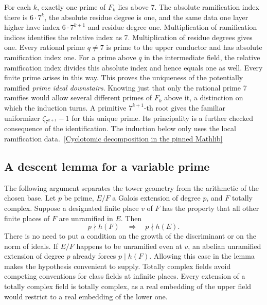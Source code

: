 \documentclass[12pt,letterpaper]{article}
\begin{document}
For each \(k\), exactly one prime of \(F_k\) lies above 7. The absolute ramification index there is \(6\cdot7^k\), the absolute residue degree is one, and the same data one layer higher have index \(6\cdot7^{k+1}\) and residue degree one. Multiplication of ramification indices identifies the relative index as 7. Multiplication of residue degrees gives one. Every rational prime \(q\ne7\) is prime to the upper conductor and has absolute ramification index one. For a prime above \(q\) in the intermediate field, the relative ramification index divides this absolute index and hence equals one as well. Every finite prime arises in this way. This proves the uniqueness of the potentially ramified \emph{prime ideal downstairs}. Knowing just that only the rational prime 7 ramifies would allow several different primes of \(F_k\) above it, a distinction on which the induction turns. A primitive \(7^{k+1}\)-th root gives the familiar uniformizer \(\zeta_{7^{k+1}}-1\) for this unique prime. Its principality is a further checked consequence of the identification. The induction below only uses the local ramification data.\
\href{https://github.com/leanprover-community/mathlib4/blob/0df444a360eaa60ab8c11dca51a86af692955474/Mathlib/NumberTheory/NumberField/Cyclotomic/Ideal.lean}{[Cyclotomic decomposition in the pinned Mathlib]}

\subsection{A descent lemma for a variable prime}

The following argument separates the tower geometry from the arithmetic of the chosen base. Let \(p\) be prime, \(E/F\) a Galois extension of degree \(p\), and \(F\) totally complex. Suppose a designated finite place \(v\) of \(F\) has the property that all other finite places of \(F\) are unramified in \(E\). Then
\[
                    p\nmid h(F) \quad\Longrightarrow\quad p\nmid h(E).
\]
There is no need to put a condition on the growth of the discriminant or on the norm of ideals. If \(E/F\) happens to be unramified even at \(v\), an abelian unramified extension of degree \(p\) already forces \(p\mid h(F)\). Allowing this case in the lemma makes the hypothesis convenient to supply. Totally complex fields avoid competing conventions for class fields at infinite places. Every extension of a totally complex field is totally complex, as a real embedding of the upper field would restrict to a real embedding of the lower one.
\end{document}
